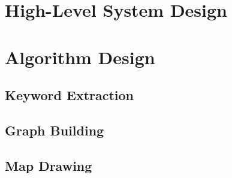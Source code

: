 \section{High-Level System Design}


\section{Algorithm Design}

\subsection{Keyword Extraction}

\subsection{Graph Building}

\subsection{Map Drawing}

